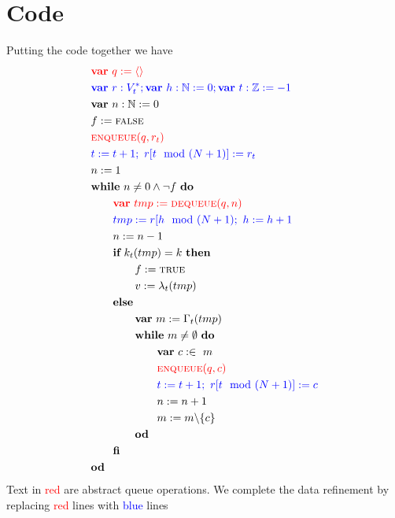 \documentclass[headings=small,a4paper,12pt]{scrartcl}
\newcommand{\enq}{\textsc{enqueue}\xspace}
\newcommand{\deq}{\textsc{dequeue}\xspace}
\begin{document}
\section{Code}
\label{sec:code}
Putting the code together we have
\begin{align}
    &\textcolor{red}{\VAR~q\Ass\langle\rangle}\\
    &\textcolor{blue}{\VAR~r:V^*_t; \VAR~h:\mathbb{N}\Ass 0; \VAR~t:\mathbb{Z}\Ass -1}\\
    &\VAR~n:\mathbb{N}\Ass 0\\
    &f\Ass \False\\
    &\textcolor{red}{\enq(q,r_t)}\\
    &\textcolor{blue}{t\Ass t+1;~r[t \mod (N+1)]\Ass r_t}\\
    &n\Ass 1\\
    &\WHILE~n \ne 0\And \Not f~\DO\\
    &\textcolor{red}{\qquad \VAR~tmp\Ass \deq(q,n)}\\
    &\qquad\textcolor{blue}{tmp\Ass r[h \mod (N+1);~h\Ass h+1}\\
    &\qquad n\Ass n-1\\
    &\qquad \IF~k_t(tmp) = k~\THEN\\
    &\qquad\qquad f\Ass \True\\
    &\qquad\qquad v\Ass \lambda_t(tmp)\\
    &\qquad \ELSE\\
    &\qquad\qquad \VAR~m\Ass \Gamma_t(tmp)\\
    &\qquad\qquad\WHILE~m \ne \emptyset~\DO\\
    &\qquad\qquad\qquad\VAR~c:\in~m\\
    &\textcolor{red}{\qquad\qquad\qquad\enq(q,c)}\\
    &\qquad\qquad\qquad\textcolor{blue}{t\Ass t+1;~r[t \mod (N+1)]\Ass c}\\
    &\qquad\qquad\qquad n \Ass n+1\\
    &\qquad\qquad\qquad m\Ass m\backslash\{c\}\\
    &\qquad\qquad\OD\\
    &\qquad\FI\\
    &\OD
\end{align}
Text in \textcolor{red}{red} are abstract queue operations. We complete the data refinement by replacing \textcolor{red}{red} lines with \textcolor{blue}{blue} lines\\
\end{document}
